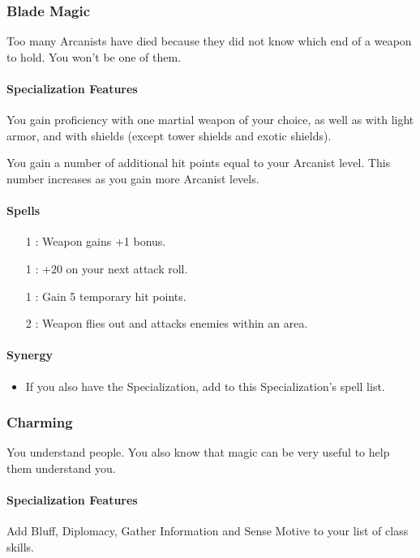 \subsubsection{Blade Magic}
Too many Arcanists have died because they did not know which end of a weapon to hold. You won't be one of them.
\paragraph{Specialization Features}
You gain proficiency with one martial weapon of your choice, as well as with light armor, and with shields (except tower shields and exotic shields). \par
You gain a number of additional hit points equal to your Arcanist level. This number increases as you gain more Arcanist levels.
\paragraph{Spells}
\begin{itemize}
 \item[1] : Weapon gains +1 bonus.
 \item[1] : +20 on your next attack roll.
 \item[1] : Gain 5 temporary hit points.
 \item[2] : Weapon flies out and attacks enemies within an area.
\end{itemize}
\paragraph{Synergy} 
\begin{itemize}
 \item If you also have the  Specialization, add  to this Specialization's spell list.
\end{itemize}

\subsubsection{Charming}
\label{Spec:Charming}
You understand people. You also know that magic can be very useful to help them understand you.
\paragraph{Specialization Features}
Add Bluff, Diplomacy, Gather Information and Sense Motive to your list of class skills.
